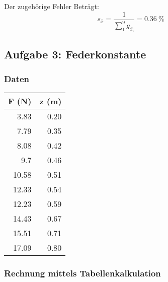 Der zugeh\"orige Fehler Betr\"agt:
\begin{equation}
    s_{\overline{x}} = \frac{1}{\sum_1^9 g_{\overline{x_i}}} = \SI{0.36}{\percent}
\end{equation}


\clearpage
\subsection{Aufgabe 3: Federkonstante}

\subsubsection{Daten}

\begin{center}
\begin{tabular}{rr}
    \toprule
    F (N) & z (m) \\
    \midrule
    3.83  & 0.20 \\
    7.79  & 0.35 \\
    8.08  & 0.42 \\
    9.7   & 0.46 \\
    10.58 & 0.51 \\
    12.33 & 0.54 \\
    12.23 & 0.59 \\
    14.43 & 0.67 \\
    15.51 & 0.71 \\
    17.09 & 0.80 \\
    \bottomrule
\end{tabular}
\end{center}

\subsubsection{Rechnung mittels Tabellenkalkulation}

